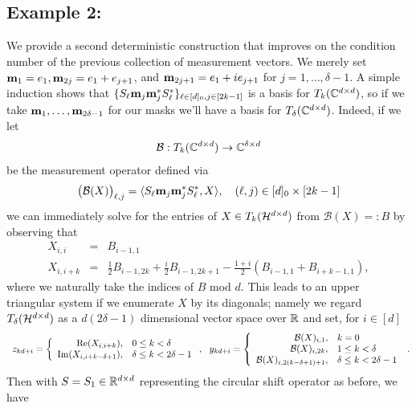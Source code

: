 \subsection*{Example 2:} We provide a second deterministic construction that improves on the condition number of the previous collection of measurement vectors.  We merely set $\mathbf m_1 = e_1, \mathbf m_{2j} = e_1 + e_{j+1}$, and 
$\mathbf m_{2j + 1} = e_1 + i e_{j+1}$ for $j = 1, \ldots, \delta - 1$.  A simple induction shows that $\{S_\ell \mathbf m_j \mathbf m_j^* S_\ell^*\}_{\ell \in [d]_0, j \in [2k - 1]}$ is a basis for $T_k(\mathbb{C}^{d \times d})$, so if we take $\mathbf m_1, \ldots, \mathbf m_{2\delta - 1}$ for our masks we'll have a basis for $T_{\delta}(\mathbb{C}^{d \times d})$.  Indeed, if we let $$\mathcal{B} : T_k(\mathbb{C}^{d \times d}) \to \mathbb{C}^{\delta \times d}$$ be the measurement operator defined via 
%
$$\big(\mathcal{B}(X)\big)_{\ell, j} = \langle S_\ell \mathbf m_j \mathbf m_j^* S_\ell^*, X \rangle, \quad (\ell, j) \in [d]_0 \times [2k - 1]$$
we can immediately solve for the entries of $X \in T_k(\mathcal{H}^{d \times d})$ from $\mathcal{B}(X) =: B$ by observing that \[\begin{array}{rcl}
X_{i,i} & = & B_{i - 1,1} \\
X_{i, i + k} & = & \frac{1}{2}B_{i - 1, 2k} + \frac{i}{2}B_{i - 1, 2k + 1} - \frac{1 + i}{2} (B_{i - 1, 1} + B_{i + k - 1, 1}), \end{array}\] where we naturally take the indices of $B$ mod $d$.  This leads to an upper triangular system if we enumerate $X$ by its diagonals; namely we regard $T_\delta(\mathcal{H}^{d \times d})$ as a $d(2 \delta - 1)$ dimensional vector space over $\mathbb{R}$ and set, for $i \in  [d]$ 
%
\[\begin{array}{ll}
z_{kd + i} =  \left\{\begin{array}{r@{,\quad}l} \operatorname{Re}(X_{i, i + k}) & 0 \le k < \delta \\ \operatorname{Im}(X_{i, i + k - \delta + 1}) & \delta \le k < 2\delta - 1 \end{array}\right., \ \ 
y_{kd + i}  =  \left\{\begin{array}{r@{,\quad}l} \mathcal{B}(X)_{i, 1} & k = 0 \\ \mathcal{B}(X)_{i, 2k} & 1 \le k < \delta \\  \mathcal{B}(X)_{i, 2(k - \delta + 1) + 1} & \delta \le k < 2 \delta - 1 \end{array}\right.
\end{array}. \] Then with $S = S_1 \in \mathbb{R}^{d \times d}$ representing the circular shift operator as before, we have  %
